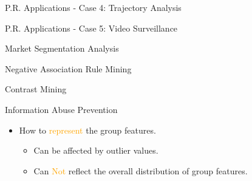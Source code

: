 \documentclass[
 size=14pt,
 paper=smartboard,  %
 mode=present, 		%
 display=slides, 	%
 style=tuliplab,  	%
 pauseslide,
 fleqn,leqno]{powerdot}
\begin{document}
\begin{slide}[toc=,bm=]{P.R. Applications - Case 4: Trajectory Analysis}


\end{slide}


\begin{slide}[toc=,bm=]{P.R. Applications - Case 5: Video Surveillance}


\end{slide}


\begin{slide}[toc=,bm=]{Market Segmentation Analysis}


\end{slide}


\begin{slide}[toc=,bm=]{Negative Association Rule Mining}


\end{slide}


\begin{slide}[toc=,bm=]{Contrast Mining}


\end{slide}


\begin{slide}{Information Abuse Prevention}
\begin{itemize}
\item
How to \textcolor{orange}{represent} the group features.

\begin{itemize}
\item
Can be affected by outlier values.

\item
Can \textcolor{orange}{Not} reflect the overall distribution of group features.
\end{itemize}
\end{itemize}

\end{slide}
\end{document}
